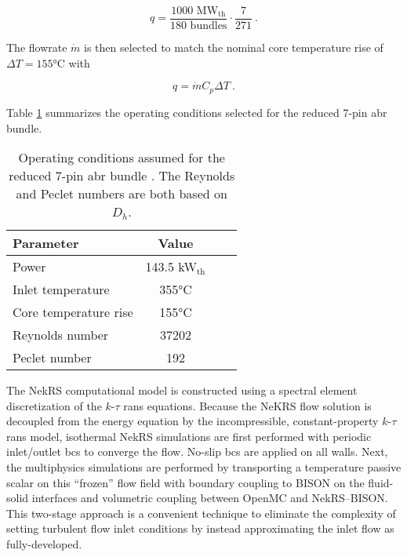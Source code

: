 \documentclass[3p,,preprint,11pt]{elsarticle}
\begin{document}
\begin{equation}
q=\frac{1000\text{\ MW}_\text{th}}{180\text{ bundles}}\cdot\frac{7}{271}\ .
\end{equation}

The flowrate $\dot{m}$ is then selected to match the nominal core temperature rise of $\Delta T=155$\si{\celsius} with

\begin{equation}
q=\dot{m}C_p\Delta T\ .
\end{equation}

Table \ref{table:coupled_specs} summarizes the operating conditions selected for the reduced 7-pin \gls{abr} bundle.

\begin{table}[htb!]
\caption{Operating conditions assumed for the reduced 7-pin \gls{abr} bundle \cite{abr}. The Reynolds and Peclet numbers are both based on $D_h$.}
\centering
\begin{tabular}{@{}lccc@{}}
\toprule
Parameter & Value\\
\midrule
Power & 143.5 \si{\kilo\watt}$_\text{th}$\\
Inlet temperature & 355\si{\celsius}\\
Core temperature rise & 155\si{\celsius}\\
Reynolds number & 37202\\
Peclet number & 192\\
\bottomrule
\end{tabular}
\label{table:coupled_specs}
\end{table}

The NekRS computational model is constructed using a spectral element discretization of the $k$-$\tau$ \gls{rans} equations. 
Because the NeKRS flow solution is decoupled from the energy equation by the incompressible, constant-property $k$-$\tau$ \gls{rans} model, isothermal NekRS simulations are first performed with periodic inlet/outlet \glspl{bc} to converge the flow. No-slip \glspl{bc} are applied on all walls. Next, the multiphysics simulations are performed by transporting a temperature passive scalar on this ``frozen'' flow field with boundary coupling to BISON on the fluid-solid interfaces and volumetric coupling between OpenMC and NekRS--BISON. This two-stage approach is a convenient technique to eliminate the complexity of setting turbulent flow inlet conditions by instead approximating the inlet flow as fully-developed. 
\end{document}
